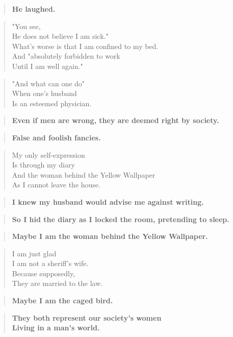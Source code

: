 \documentclass[twocolumn]{article}
\begin{document}
\begin{verse}
\textbf{He laughed.} \\
\end{verse}

\begin{verse}
"You see, \\
He does not believe I am sick." \\
What's worse is that I am confined to my bed. \\
And "absolutely forbidden to work \\
Until I am well again." \\
\end{verse}

\begin{verse}
"And what can one do" \\
When one's husband \\
Is an esteemed physician. \\
\end{verse}

\begin{verse}
\textbf{Even if men are wrong, they are deemed right by society.} \\
\end{verse}

\begin{verse}
\textbf{False and foolish fancies.} \\
\end{verse}

\begin{verse}
My only self-expression \\
Is through my diary \\
And the woman behind the Yellow Wallpaper \\
As I cannot leave the house. \\
\end{verse}

\begin{verse}
\textbf{I knew my husband would advise me against writing.} \\
\end{verse}

\begin{verse}
\textbf{So I hid the diary as I locked the room, pretending to sleep.} \\
\end{verse}

\begin{verse}
\textbf{Maybe I am the woman behind the Yellow Wallpaper.} \\
\end{verse}
\newpage
\begin{verse}
I am just glad \\ 
I am not a sheriff's wife. \\
Because supposedly, \\
They are married to the law. \\
\end{verse}

\begin{verse}
\textbf{Maybe I am the caged bird.} \\
\end{verse}

\begin{verse}
\textbf{They both represent our society's women \\
Living in a man's world.} \\
\end{verse}
\end{document}
